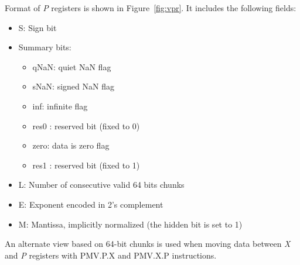 Format of {\em P} registers is shown in Figure~\ref{fig:vpr}.
It includes the following fields:
\begin{itemize}[topsep=0pt]
    \item S: Sign bit
    \item Summary bits:
    \begin{itemize}[topsep=0pt]
        \item qNaN: quiet NaN flag
        \item sNaN: signed NaN flag
        \item inf: infinite flag
        \item res0 : reserved bit (fixed to 0)
        \item zero: data is zero flag
        \item res1 : reserved bit (fixed to 1)
    \end{itemize}
    \item L: Number of consecutive valid 64 bits chunks
    \item E: Exponent encoded in 2's complement
    \item M: Mantissa, implicitly normalized (the hidden bit is set to 1)
\end{itemize}

An alternate view based on 64-bit chunks is used when moving data between {\em X} and {\em P} registers with PMV.P.X and PMV.X.P instructions.

